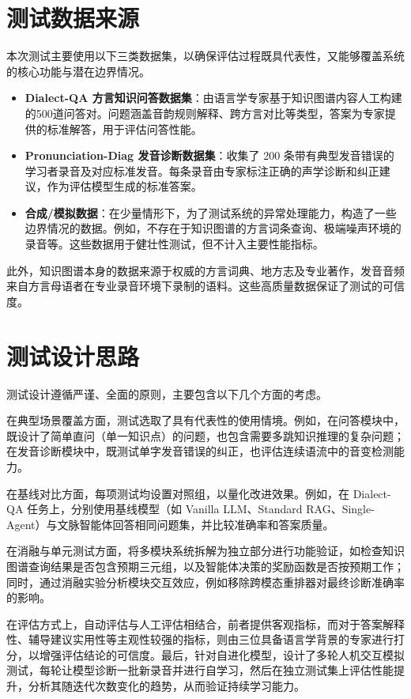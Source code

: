 \section{测试数据来源}
本次测试主要使用以下三类数据集，以确保评估过程既具代表性，又能够覆盖系统的核心功能与潜在边界情况。
\begin{itemize}

	\item \textbf{Dialect-QA 方言知识问答数据集}：由语言学专家基于知识图谱内容人工构建的500道问答对。问题涵盖音韵规则解释、跨方言对比等类型，答案为专家提供的标准解答，用于评估问答性能。

    \item \textbf{Pronunciation-Diag 发音诊断数据集}：收集了 200 条带有典型发音错误的学习者录音及对应标准发音。每条录音由专家标注正确的声学诊断和纠正建议，作为评估模型生成的标准答案。
    \item \textbf{合成/模拟数据}：在少量情形下，为了测试系统的异常处理能力，构造了一些边界情况的数据。例如，不存在于知识图谱的方言词条查询、极端噪声环境的录音等。这些数据用于健壮性测试，但不计入主要性能指标。
\end{itemize}

此外，知识图谱本身的数据来源于权威的方言词典、地方志及专业著作，发音音频来自方言母语者在专业录音环境下录制的语料。这些高质量数据保证了测试的可信度。

\section{测试设计思路}
测试设计遵循严谨、全面的原则，主要包含以下几个方面的考虑。

在典型场景覆盖方面，测试选取了具有代表性的使用情境。例如，在问答模块中，既设计了简单直问（单一知识点）的问题，也包含需要多跳知识推理的复杂问题；在发音诊断模块中，既测试单字发音错误的纠正，也评估连续语流中的音变检测能力。

在基线对比方面，每项测试均设置对照组，以量化改进效果。例如，在 Dialect-QA 任务上，分别使用基线模型（如 Vanilla LLM、Standard RAG、Single-Agent）与文脉智能体回答相同问题集，并比较准确率和答案质量。

在消融与单元测试方面，将多模块系统拆解为独立部分进行功能验证，如检查知识图谱查询结果是否包含预期三元组，以及智能体决策的奖励函数是否按预期工作；同时，通过消融实验分析模块交互效应，例如移除跨模态重排器对最终诊断准确率的影响。

在评估方式上，自动评估与人工评估相结合，前者提供客观指标，而对于答案解释性、辅导建议实用性等主观性较强的指标，则由三位具备语言学背景的专家进行打分，以增强评估结论的可信度。最后，针对自进化模型，设计了多轮人机交互模拟测试，每轮让模型诊断一批新录音并进行自学习，然后在独立测试集上评估性能提升，分析其随迭代次数变化的趋势，从而验证持续学习能力。

